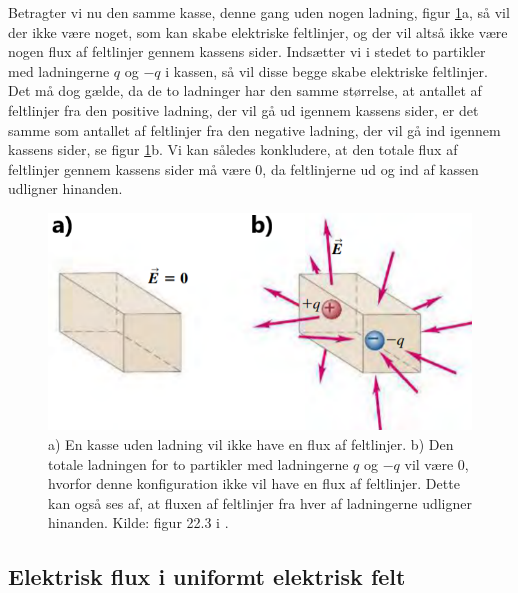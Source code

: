 Betragter vi nu den samme kasse, denne gang uden nogen ladning, figur \ref{fig:ElectricFluxVisualisationBoxWithoutCharge}a, så vil der ikke være noget, som kan skabe elektriske feltlinjer, og der vil altså ikke være nogen flux af feltlinjer gennem kassens sider. Indsætter vi i stedet to partikler med ladningerne $q$ og $-q$ i kassen, så vil disse begge skabe elektriske feltlinjer. Det må dog gælde, da de to ladninger har den samme størrelse, at antallet af feltlinjer fra den positive ladning, der vil gå ud igennem kassens sider, er det samme som antallet af feltlinjer fra den negative ladning, der vil gå ind igennem kassens sider, se figur \ref{fig:ElectricFluxVisualisationBoxWithoutCharge}b. Vi kan således konkludere, at den totale flux af feltlinjer gennem kassens sider må være $0$, da feltlinjerne ud og ind af kassen udligner hinanden.  

\begin{figure}[h!]
    \centering
    \includegraphics[width=.5\textwidth]{Elektro/Figurer/ElektricFluxVisualisation2.PNG}
    \caption{a) En kasse uden ladning vil ikke have en flux af feltlinjer. b) Den totale ladningen for to partikler med ladningerne $q$ og $-q$ vil være $0$, hvorfor denne konfiguration ikke vil have en flux af feltlinjer. Dette kan også ses af, at fluxen af feltlinjer fra hver af ladningerne udligner hinanden. Kilde: figur 22.3 i \cite{youngSearsZemanskyUniversity2016}.}
    \label{fig:ElectricFluxVisualisationBoxWithoutCharge}
\end{figure}

\subsection{Elektrisk flux i uniformt elektrisk felt}

